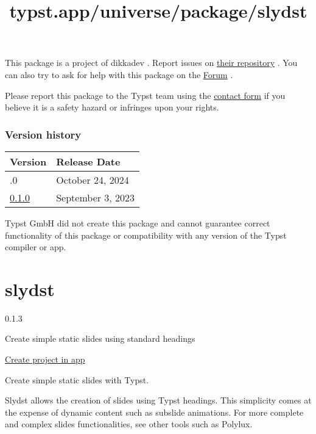 This package is a project of dikkadev . Report issues on
\href{https://github.com/dikkadev/typst-statastic}{their repository} .
You can also try to ask for help with this package on the
\href{https://forum.typst.app}{Forum} .

Please report this package to the Typst team using the
\href{https://typst.app/contact}{contact form} if you believe it is a
safety hazard or infringes upon your rights.

\label{versions}
\subsubsection{Version history}\label{version-history}

\begin{longtable}[]{@{}ll@{}}
\toprule\noalign{}
Version & Release Date \\
\midrule\noalign{}
\endhead
\bottomrule\noalign{}
\endlastfoot
1.0.0 & October 24, 2024 \\
\href{https://typst.app/universe/package/statastic/0.1.0/}{0.1.0} &
September 3, 2023 \\
\end{longtable}

Typst GmbH did not create this package and cannot guarantee correct
functionality of this package or compatibility with any version of the
Typst compiler or app.


\title{typst.app/universe/package/slydst}

\label{banner}
\label{template-thumbnail}

\section{slydst}\label{slydst}

{ 0.1.3 }

Create simple static slides using standard headings

\href{/app?template=slydst&version=0.1.3}{Create project in app}

\label{readme}
Create simple static slides with Typst.

Slydst allows the creation of slides using Typst headings. This
simplicity comes at the expense of dynamic content such as subslide
animations. For more complete and complex slides functionalities, see
other tools such as Polylux.

